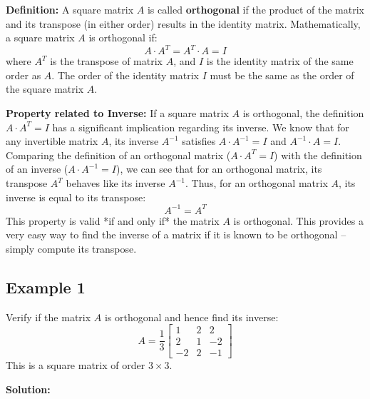 \documentclass{article}
\begin{document}
\textbf{Definition:}
A square matrix $A$ is called \textbf{orthogonal} if the product of the matrix and its transpose (in either order) results in the identity matrix.
Mathematically, a square matrix $A$ is orthogonal if:
\[ A \cdot A^T = A^T \cdot A = I \]
where $A^T$ is the transpose of matrix $A$, and $I$ is the identity matrix of the same order as $A$. The order of the identity matrix $I$ must be the same as the order of the square matrix $A$.

\textbf{Property related to Inverse:}
If a square matrix $A$ is orthogonal, the definition $A \cdot A^T = I$ has a significant implication regarding its inverse. We know that for any invertible matrix $A$, its inverse $A^{-1}$ satisfies $A \cdot A^{-1} = I$ and $A^{-1} \cdot A = I$.
Comparing the definition of an orthogonal matrix ($A \cdot A^T = I$) with the definition of an inverse ($A \cdot A^{-1} = I$), we can see that for an orthogonal matrix, its transpose $A^T$ behaves like its inverse $A^{-1}$.
Thus, for an orthogonal matrix $A$, its inverse is equal to its transpose:
\[ A^{-1} = A^T \]
This property is valid *if and only if* the matrix $A$ is orthogonal. This provides a very easy way to find the inverse of a matrix if it is known to be orthogonal – simply compute its transpose.

\subsection{Example 1} %
Verify if the matrix $A$ is orthogonal and hence find its inverse:
\[ A = \frac{1}{3} \begin{bmatrix} 1 & 2 & 2 \\ 2 & 1 & -2 \\ -2 & 2 & -1 \end{bmatrix} \]
This is a square matrix of order $3 \times 3$.

\textbf{Solution:}
\end{document}
